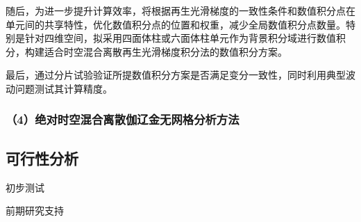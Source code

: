 随后，为进一步提升计算效率，将根据再生光滑梯度的一致性条件和数值积分点在单元间的共享特性，优化数值积分点的位置和权重，减少全局数值积分点数量。特别是针对四维空间，拟采用四面体柱或六面体柱单元作为背景积分域进行数值积分，构建适合时空混合离散再生光滑梯度积分法的数值积分方案。

    

最后，通过分片试验验证所提数值积分方案是否满足变分一致性，同时利用典型波动问题测试其计算精度。

\subsubsection*{\bfseries （4）绝对时空混合离散伽辽金无网格分析方法}

\subsection{可行性分析}

初步测试

前期研究支持

